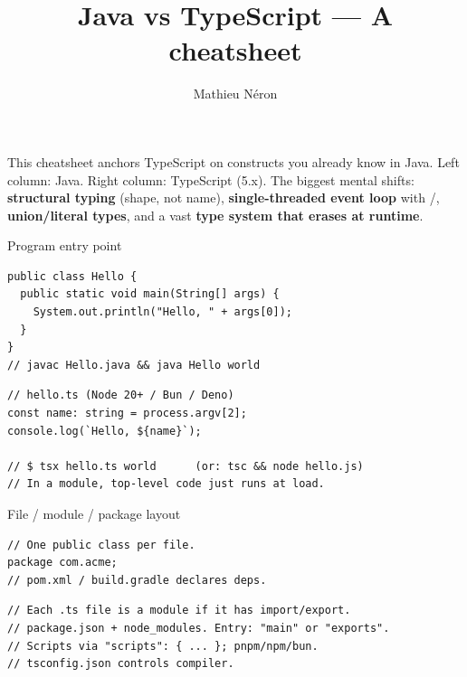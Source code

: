 \documentclass[10pt]{article}
\title{Java vs TypeScript --- A cheatsheet}
\author{Mathieu N\'eron}
\begin{document}

\noindent\small This cheatsheet anchors TypeScript on constructs you already know in
Java. Left column: Java. Right column: TypeScript (5.x). The biggest mental shifts:
\textbf{structural typing} (shape, not name), \textbf{single-threaded event loop}
with /, \textbf{union/literal types}, and a vast \textbf{type
system that erases at runtime}.


\begin{construct}{Program entry point}
\noindent
\begin{minipage}[t]{0.485\linewidth}
\begin{lstlisting}[style=java, title=Java]
public class Hello {
  public static void main(String[] args) {
    System.out.println("Hello, " + args[0]);
  }
}
// javac Hello.java && java Hello world
\end{lstlisting}
\end{minipage}\hfill
\begin{minipage}[t]{0.485\linewidth}
\begin{lstlisting}[style=ts, title=TypeScript]
// hello.ts (Node 20+ / Bun / Deno)
const name: string = process.argv[2];
console.log(`Hello, ${name}`);

// $ tsx hello.ts world      (or: tsc && node hello.js)
// In a module, top-level code just runs at load.
\end{lstlisting}
\end{minipage}
\end{construct}

\begin{construct}{File / module / package layout}
\noindent
\begin{minipage}[t]{0.485\linewidth}
\begin{lstlisting}[style=java, title=Java]
// One public class per file.
package com.acme;
// pom.xml / build.gradle declares deps.
\end{lstlisting}
\end{minipage}\hfill
\begin{minipage}[t]{0.485\linewidth}
\begin{lstlisting}[style=ts, title=TypeScript]
// Each .ts file is a module if it has import/export.
// package.json + node_modules. Entry: "main" or "exports".
// Scripts via "scripts": { ... }; pnpm/npm/bun.
// tsconfig.json controls compiler.
\end{lstlisting}
\end{minipage}
\end{construct}
\end{document}
